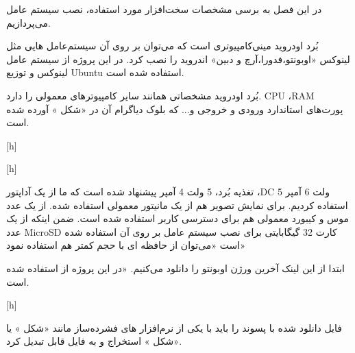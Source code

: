 
در این فصل به برسی مشخصات سخت‌افزار مورد استفاده، نصب سیستم عامل می‌پردازیم.

بُرد اودروید مینی‌کامپیوتری است که می‌توان بر روی آن سیستم‌عامل هایی مثل لینوکس «اوبونتو،فدورا،آرچ و دبین»
اندروید را نصب کرد. در این پروژه از سیستم عامل لینوکس و توزیع Ubuntu استفاده شده است.

بُرد اودروید مشخصاتی همانند سایر کامپیوترهای معمولی را دارد. CPU ،RAM پورت‌های استاندارد ورودی و خروجی و... که بلوک دیاگرام آن در «شکل » آورده شده است.


[h]

[h]

تغذیه بُرد، 5 ولت 4 آمپر پیشنهاد شده است که ما از یک آداپتور ،DC 5 ولت 6 آمپر استفاده کردیم. برای نمایش تصویر هم از یک مانیتور معمولی استفاده شده. از یک عدد موس و کیبورد معمولی هم برای دسترسی کاربر استفاده شده است. ضمن اینکه از یک عدد MicroSD کارت 32 گیگابایتی برای نصب سیستم عامل بر روی آن استفاده شده است «می‌توان از حافظه ای با حجم کمتر هم استفاده نمود»

ابتدا از این لینک آخرین ورژن اوبونتو را دانلود می‌کنیم.
«در این پروژه از  استفاده شده است.

[h]

فایل دانلود شده با پسوند  را باید با یکی از نرم‌افزار های فشرده‌ساز مانند  «شکل » یا  «شکل » استخراج و به فایل قابل  تبدیل کرد.

